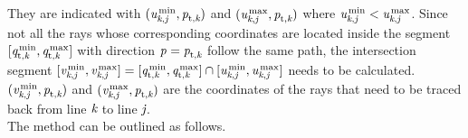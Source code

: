They are indicated with  $(\textit{u}_{\textit{k},\textit{j}}^\textrm{\,min}, \textit{p}_{\textrm{t,} \textit{\textit{k}}})$ and $(\textit{u}_{\textit{k},\textit{j}}^\textrm{\,max}, \textit{p}_{\textrm{t,} \textit{\textit{k}}})$ where 
$\textit{u}_{\textit{k},\textit{j}}^\textrm{\,min}<\textit{u}_{\textit{k},\textit{j}}^\textrm{\,max}$. 
Since not all the rays whose corresponding coordinates are located inside the segment
$[\textit{q}_{\textrm{t,} \textit{\textit{k}}}^\textrm{\,min}, \textit{q}_{\textrm{t,} \textit{\textit{k}}}^\textrm{\,max}]$ with direction $ \textit{p}_{\textrm{} \textit{}} =\textit{p}_{\textrm{t,} \textit{\textit{k}}}$ follow the same path, the intersection segment 
$[\textit{v}_{\textit{k},\textit{j}}^\textrm{\,min}, \textit{v}_{\textit{k},\textit{j}}^\textrm{\,max}] = [\textit{q}_{\textrm{t,} \textit{\textit{k}}}^\textrm{\,min}, \textit{q}_{\textrm{t,} \textit{\textit{k}}}^\textrm{\,max}] \cap [\textit{u}_{\textit{k},\textit{j}}^\textrm{\,min}, \textit{u}_{\textit{k},\textit{j}}^\textrm{\,max}]$ needs to be calculated. $(\textit{v}_{\textit{k},\textit{j}}^\textrm{\,min},\textit{p}_{\textrm{t,} \textit{\textit{k}}})$ and $(\textit{v}_{\textit{k},\textit{j}}^\textrm{\,max},\textit{p}_{\textrm{t,} \textit{\textit{k}}})$ are the coordinates of the rays that need to be traced back from line $\textit{k}$ to line $\textit{j}$.
\\ \indent The method can be outlined as follows.
